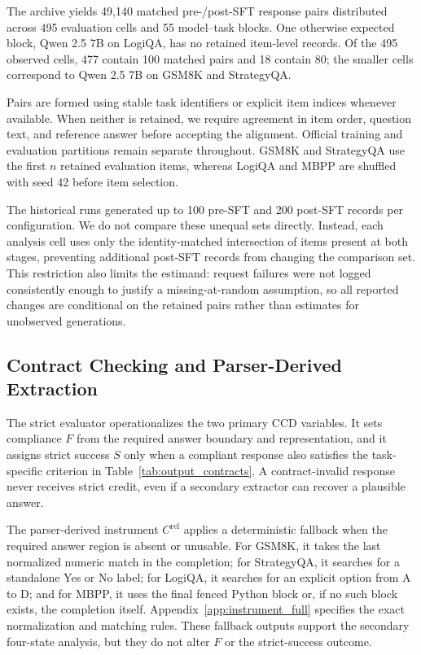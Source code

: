 \documentclass{article}
\begin{document}
The archive yields 49,140 matched pre-/post-SFT response pairs distributed across 495 evaluation cells and 55 model--task blocks. One otherwise expected block, Qwen 2.5 7B on LogiQA, has no retained item-level records. Of the 495 observed cells, 477 contain 100 matched pairs and 18 contain 80; the smaller cells correspond to Qwen 2.5 7B on GSM8K and StrategyQA.

Pairs are formed using stable task identifiers or explicit item indices whenever available. When neither is retained, we require agreement in item order, question text, and reference answer before accepting the alignment. Official training and evaluation partitions remain separate throughout. GSM8K and StrategyQA use the first \(n\) retained evaluation items, whereas LogiQA and MBPP are shuffled with seed 42 before item selection.

The historical runs generated up to 100 pre-SFT and 200 post-SFT records per configuration. We do not compare these unequal sets directly. Instead, each analysis cell uses only the identity-matched intersection of items present at both stages, preventing additional post-SFT records from changing the comparison set. This restriction also limits the estimand: request failures were not logged consistently enough to justify a missing-at-random assumption, so all reported changes are conditional on the retained pairs rather than estimates for unobserved generations.

\subsection{Contract Checking and Parser-Derived Extraction}

The strict evaluator operationalizes the two primary CCD variables. It sets compliance \(F\) from the required answer boundary and representation, and it assigns strict success \(S\) only when a compliant response also satisfies the task-specific criterion in Table~\ref{tab:output_contracts}. A contract-invalid response never receives strict credit, even if a secondary extractor can recover a plausible answer.

The parser-derived instrument \(C^{\mathrm{rel}}\) applies a deterministic fallback when the required answer region is absent or unusable. For GSM8K, it takes the last normalized numeric match in the completion; for StrategyQA, it searches for a standalone Yes or No label; for LogiQA, it searches for an explicit option from A to D; and for MBPP, it uses the final fenced Python block or, if no such block exists, the completion itself. Appendix~\ref{app:instrument_full} specifies the exact normalization and matching rules. These fallback outputs support the secondary four-state analysis, but they do not alter \(F\) or the strict-success outcome.
\end{document}

